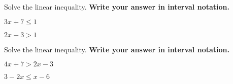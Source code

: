 
\newpage
\begin{exercise}
	Solve the linear inequality. \textbf{Write your answer in interval notation.}

	\noindent
	\begin{enumerate*}[label=\textup{(\arabic*)~}]
		\item  $3x + 7 \leq 1$
		\item  $2x-3>1$
		\hfill\null
	\end{enumerate*}
\end{exercise}

\vfill

\begin{center}\hfill
	\raisebox{0.4em}{
		\rotatebox{\rotationdegree}{
			\parbox{\textwidth}{
				\begin{enumerate*}[label={\theexer~(\arabic*)~}]
					\item  $(-\infty, -2]$
					\item  $(2, +\infty) $\hfill\null
				\end{enumerate*}
			}
		}
	}
\end{center}


\begin{exercise}
	Solve the linear inequality. \textbf{Write your answer in interval notation.}

	\noindent
	\begin{enumerate*}[label=\textup{(\arabic*)~}]
		\item  $4x + 7 > 2x-3$
		\item  $3-2x\leq x-6 $
		\hfill\null
	\end{enumerate*}
\end{exercise}

\vfill

\begin{center}\hfill
	\raisebox{0.4em}{
		\rotatebox{\rotationdegree}{
			\parbox{\textwidth}{
				\begin{enumerate*}[label={\theexer~(\arabic*)~}]
					\item  $(-5, +\infty)$
					\item  $[3,+\infty)$\hfill\null
				\end{enumerate*}
			}
		}
	}
\end{center}


